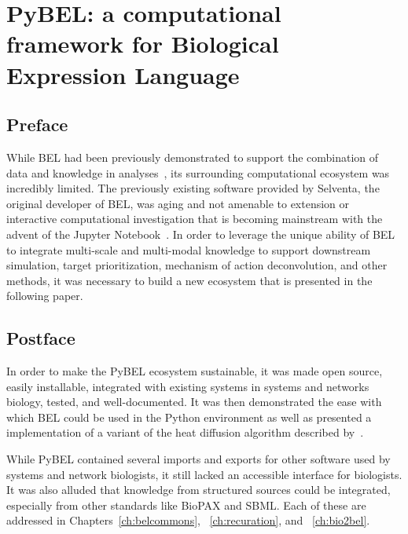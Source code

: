 \chapter{PyBEL: a computational framework for Biological Expression Language}
\label{ch:pybel}

\section*{Preface}

While \ac{BEL} had been previously demonstrated to support the combination of data and knowledge in analyses~\cite{Martin2012,Laifenfeld2012,Catlett2013,Martin2014,Vasilyev2014,Laifenfeld2014}, its surrounding computational ecosystem was incredibly limited.
The previously existing software provided by Selventa, the original developer of BEL, was aging and not amenable to extension or interactive computational investigation that is becoming mainstream with the advent of the Jupyter Notebook~\cite{Kluyver2016}.
In order to leverage the unique ability of \ac{BEL} to integrate multi-scale and multi-modal knowledge to support downstream simulation, target prioritization, mechanism of action deconvolution, and other methods, it was necessary to build a new ecosystem that is presented in the following paper.

\vspace*{\fill}



\section*{Postface}

In order to make the PyBEL ecosystem sustainable, it was made open source, easily installable, integrated with existing systems in systems and networks biology, tested, and well-documented.
It was then demonstrated the ease with which \ac{BEL} could be used in the Python environment as well as presented a implementation of a variant of the heat diffusion algorithm described by~\cite{Leiserson2015}.

While PyBEL contained several imports and exports for other software used by systems and network biologists, it still lacked an accessible interface for biologists.
It was also alluded that knowledge from structured sources could be integrated, especially from other standards like \ac{BioPAX} and \ac{SBML}.
Each of these are addressed in Chapters~\ref{ch:belcommons}, ~\ref{ch:recuration}, and ~\ref{ch:bio2bel}.
